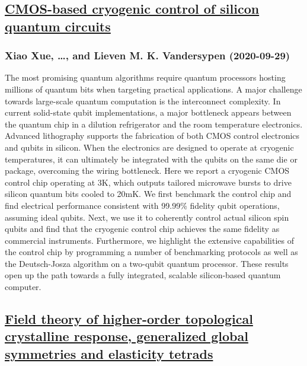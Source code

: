 \subsection*{\href{http://arxiv.org/abs/2009.14185v1}{CMOS-based cryogenic control of silicon quantum circuits}}
\subsubsection*{Xiao Xue, \dots, and Lieven M. K. Vandersypen (2020-09-29)}
The most promising quantum algorithms require quantum processors hosting
millions of quantum bits when targeting practical applications. A major
challenge towards large-scale quantum computation is the interconnect
complexity. In current solid-state qubit implementations, a major bottleneck
appears between the quantum chip in a dilution refrigerator and the room
temperature electronics. Advanced lithography supports the fabrication of both
CMOS control electronics and qubits in silicon. When the electronics are
designed to operate at cryogenic temperatures, it can ultimately be integrated
with the qubits on the same die or package, overcoming the wiring bottleneck.
Here we report a cryogenic CMOS control chip operating at 3K, which outputs
tailored microwave bursts to drive silicon quantum bits cooled to 20mK. We
first benchmark the control chip and find electrical performance consistent
with 99.99\% fidelity qubit operations, assuming ideal qubits. Next, we use it
to coherently control actual silicon spin qubits and find that the cryogenic
control chip achieves the same fidelity as commercial instruments. Furthermore,
we highlight the extensive capabilities of the control chip by programming a
number of benchmarking protocols as well as the Deutsch-Josza algorithm on a
two-qubit quantum processor. These results open up the path towards a fully
integrated, scalable silicon-based quantum computer.

\subsection*{\href{http://arxiv.org/abs/2009.14184v1}{Field theory of higher-order topological crystalline response,  generalized global symmetries and elasticity tetrads}}
